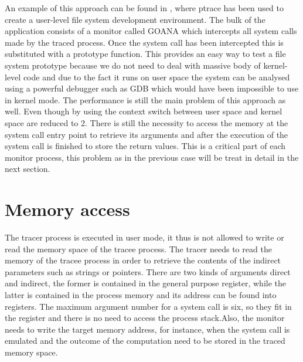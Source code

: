 An example of this approach can be found in \cite{goanna}, where ptrace has been used to create a user-level file system development environment.  The bulk of the application consists of a monitor called GOANA which intercepts all system calls made by the traced process. Once the system call has been intercepted this is substituted with a prototype function.  This provides an easy way to test a file system prototype because we do not need to deal with massive body of kernel-level code and  due to the fact it runs on user space the system can be analysed using a powerful debugger such as GDB which would have been impossible to use in kernel mode. 
The performance is still the main problem of this approach as well.   Even though by using  the context switch between user space and kernel space are reduced to 2. There is still the necessity  to access the memory at the system call entry point to retrieve its arguments and after the execution of the system call is finished to store the return values. This is a critical part of each monitor process, this problem as in the previous case will be treat in detail in the next section. \\


\section{Memory access}
\label{memory_access}

The tracer process is executed in user mode, it thus is not allowed to write or read the memory space of the tracee process. The tracer needs to read the memory of the tracee process in order to retrieve the contents of the indirect parameters such as strings or pointers.
There are two kinds of arguments direct and indirect, the former is contained in the general purpose register, while the latter is contained in the process memory and its address can be found into registers. The maximum argument number for a system call is six, so they fit in the register and there is no need to access the process stack.Also, the monitor needs to write the target memory address, for instance, when the system call is emulated and the outcome of the computation need to be stored in the traced memory space.\\

